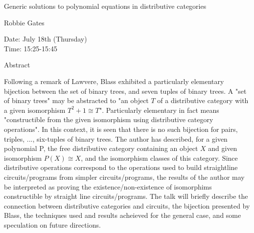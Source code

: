 \begin{center}
\LARGE
Generic solutions to polynomial equations in distributive
                            categories
\end{center}

\begin{center}
\Large
Robbie Gates
\end{center}

\noindent
Date:  July 18th (Thursday)\\
Time:  15:25-15:45\\

\begin{center}
\large
Abstract
\end{center}

Following a remark of Lawvere, Blass exhibited a particularly elementary bijection between the
set of binary trees, and seven tuples of binary trees. A "set of binary trees" may be abstracted to
"an object $T$ of a distributive category with a given isomorphism $T^2 + 1 \cong T$".
Particularly elementary in fact means "constructible from the given isomorphism using
distributive category operations". In this context, it is seen that there is no such bijection for pairs,
triples, ..., six-tuples of binary trees. The author has described, for a given polynomial P, the free
distributive category containing an object $X$ and given isomorphism $P(X) \cong X$, and the
isomorphism classes of this category. Since distributive operations correspond to the operations
used to build straightline circuits/programs from simpler circuits/programs, the results of the
author may be interpreted as proving the existence/non-existence of isomorphims constructible by
straight line circuits/programs. The talk will briefly describe the connection between distributive
categories and circuits, the bijection presented by Blass, the techniques used and results acheieved
for the general case, and some speculation on future directions. 

